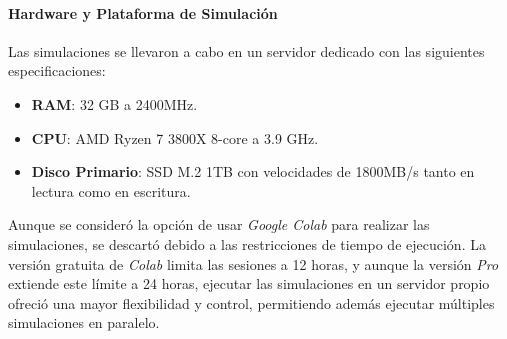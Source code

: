 \paragraph{Hardware y Plataforma de Simulación}
Las simulaciones se llevaron a cabo en un servidor dedicado con las siguientes especificaciones:
\begin{itemize}
    \item \textbf{RAM}: 32 GB a 2400MHz.
    \item \textbf{CPU}: AMD Ryzen 7 3800X 8-core a 3.9 GHz.
    \item \textbf{Disco Primario}: SSD M.2 1TB con velocidades de 1800MB/s tanto en lectura como en escritura.
\end{itemize}
Aunque se consideró la opción de usar \textit{Google Colab} para realizar las simulaciones, se descartó debido a las restricciones de tiempo de ejecución. La versión gratuita de \textit{Colab} limita las sesiones a 12 horas, y aunque la versión \textit{Pro} extiende este límite a 24 horas, ejecutar las simulaciones en un servidor propio ofreció una mayor flexibilidad y control, permitiendo además ejecutar múltiples simulaciones en paralelo.
